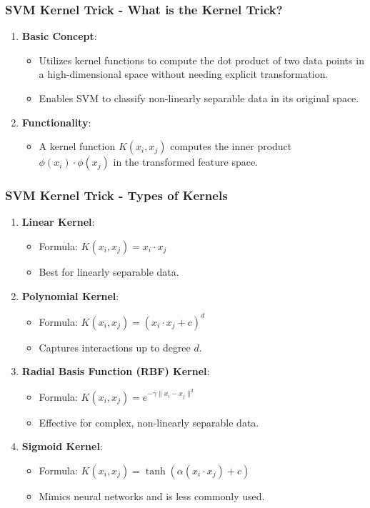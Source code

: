 \documentclass[aspectratio=169]{beamer}
\begin{document}
\begin{frame}[fragile]
    \frametitle{SVM Kernel Trick - What is the Kernel Trick?}
    \begin{enumerate}
        \item \textbf{Basic Concept}:
        \begin{itemize}
            \item Utilizes kernel functions to compute the dot product of two data points in a high-dimensional space without needing explicit transformation.
            \item Enables SVM to classify non-linearly separable data in its original space.
        \end{itemize}
        \item \textbf{Functionality}:
        \begin{itemize}
            \item A kernel function \( K(x_i, x_j) \) computes the inner product \( \phi(x_i) \cdot \phi(x_j) \) in the transformed feature space.
        \end{itemize}
    \end{enumerate}
\end{frame}

\begin{frame}[fragile]
    \frametitle{SVM Kernel Trick - Types of Kernels}
    \begin{enumerate}
        \item \textbf{Linear Kernel}:
        \begin{itemize}
            \item Formula: \( K(x_i, x_j) = x_i \cdot x_j \)
            \item Best for linearly separable data.
        \end{itemize}
        \item \textbf{Polynomial Kernel}:
        \begin{itemize}
            \item Formula: \( K(x_i, x_j) = (x_i \cdot x_j + c)^d \)
            \item Captures interactions up to degree \( d \).
        \end{itemize}
        \item \textbf{Radial Basis Function (RBF) Kernel}:
        \begin{itemize}
            \item Formula: \( K(x_i, x_j) = e^{-\gamma \|x_i - x_j\|^2} \)
            \item Effective for complex, non-linearly separable data.
        \end{itemize}
        \item \textbf{Sigmoid Kernel}:
        \begin{itemize}
            \item Formula: \( K(x_i, x_j) = \tanh(\alpha (x_i \cdot x_j) + c) \)
            \item Mimics neural networks and is less commonly used.
        \end{itemize}
    \end{enumerate}
\end{frame}
\end{document}
